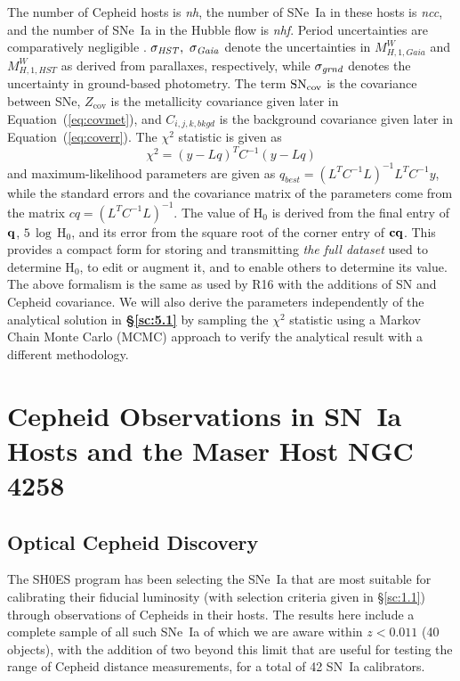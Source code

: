 \documentclass[12pt]{aastex631}
\newcommand{\bq}{\begin{equation}}
\newcommand{\eq}{\end{equation}}
\begin{document}
The number of Cepheid hosts is \textit{nh}, the number of SNe~Ia in these hosts is \textit{ncc}, and the number of SNe~Ia in the Hubble flow is \textit{nhf}. Period uncertainties are comparatively negligible \citep{Yuan:2021_N4051}. $\sigma_{\it HST}, \ \sigma_{\it Gaia}$ denote the uncertainties in  $M_{H,1,Gaia}^W$ and $M_{H,1,HST}^W$ as derived from parallaxes, respectively, while $\sigma_{\it grnd}$ denotes the uncertainty in ground-based photometry. The term ${\rm SN}_{\textrm{cov}}$ is the covariance between SNe, $Z_{\textrm{cov}}$ is the metallicity covariance given later in Equation~(\ref{eq:covmet}), and $C_{i,j,k,bkgd}$ is the background covariance given later in Equation~(\ref{eq:coverr}). The $\chi^2$ statistic is given as \bq \chi^2=(y-Lq)^TC^{-1}(y-Lq)\label{eq:chisq} \eq and maximum-likelihood parameters are given as $q_{\textit{best}}=(L^TC^{-1}L)^{-1}L^TC^{-1}y$, while the standard errors and the covariance matrix of the parameters come from the matrix $cq=(L^TC^{-1}L)^{-1}$.   The value of H$_0$ is derived from the final entry of ${\bf q}$, $5\,\log\,$H$_0$, and its error from the square root of the corner entry of ${\bf cq}$.  This provides a compact form for storing and transmitting {\it the full dataset} used to determine H$_0$, to edit or augment it, and to enable others to determine its value. The above formalism is the same as used by R16 with the additions of SN and Cepheid covariance.  We will also derive the parameters independently of the analytical solution in {\bf \S\ref{sc:5.1}} by sampling the $\chi^2$ statistic using a Markov Chain Monte Carlo (MCMC) approach to verify the analytical result with a different methodology.

\section{Cepheid Observations in SN~Ia Hosts and the Maser Host NGC$\,$4258\label{sc:3}}
\subsection{Optical Cepheid Discovery\label{sc:3.1}}
   
The SH0ES program has been selecting the SNe~Ia that are most suitable for calibrating their fiducial luminosity (with selection criteria given in \S\ref{sc:1.1}) through observations of Cepheids in their hosts.   The results here include a complete sample of all such SNe~Ia of which we are aware within $z<0.011$ (40 objects), with the addition of two beyond this limit that are useful for testing the range of Cepheid distance measurements, for a total of 42 SN~Ia calibrators.
\end{document}
